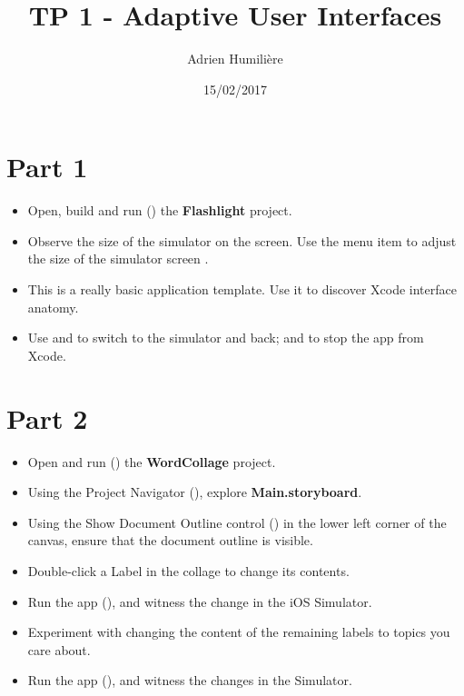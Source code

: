 \documentclass[a4paper,11pt]{scrartcl}
\begin{document}
\newcommand{\mytitle}{TP 1 - Adaptive User Interfaces}
\title{\mytitle}
\author{Adrien Humilière}
\date{15/02/2017}

\maketitle

\section*{Part 1}

\begin{itemize}
\item Open, build and run () the \textbf{Flashlight} project.
\item Observe the size of the simulator on the screen. Use the menu item  to adjust the size of the simulator screen       .
\item This is a really basic application template. Use it to discover Xcode interface anatomy.
\item Use \keys{\cmd+\tab} and  to switch to the simulator and back; and to stop the app from Xcode.
\end{itemize}

\section*{Part 2}

\begin{itemize}
\item Open and run () the \textbf{WordCollage} project.
\item Using the Project Navigator (), explore \textbf{Main.storyboard}.
\item Using the Show Document Outline control () in the lower left corner of the canvas, ensure that the document outline is visible.
\item Double-click a Label in the collage to change its contents.
\item Run the app (), and witness the change in the iOS Simulator.
\item Experiment with changing the content of the remaining labels to topics you care about.
\item Run the app (), and witness the changes in the Simulator.
\end{itemize}
\end{document}
